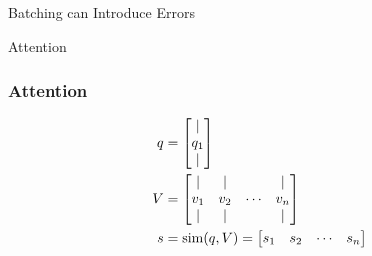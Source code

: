 \documentclass{beamer}
\newcommand{\similar}{\mathop{\rm sim}\nolimits}
\begin{document}
\begin{section}{Batching can Introduce Errors}
\begin{subsection}{Attention}
\begin{frame}
        \end{frame}

        \begin{frame}
            \frametitle{Attention}

            \begin{align*}
                q &= \begin{bmatrix}
                        \vert \\
                        q_1\\
                        \vert
                    \end{bmatrix} \\
                V &= \begin{bmatrix}
                         \vert & \vert & & \vert \\
                         v_1 & v_2 & \cdots & v_n \\
                         \vert & \vert & & \vert
                     \end{bmatrix} \\
                s &= \similar(q, V) = \begin{bmatrix}
                        s_1 & s_2 & \cdots & s_n \\
                    \end{bmatrix}
            \end{align*}

        \end{frame}


\end{subsection}
\end{section}
\end{document}
